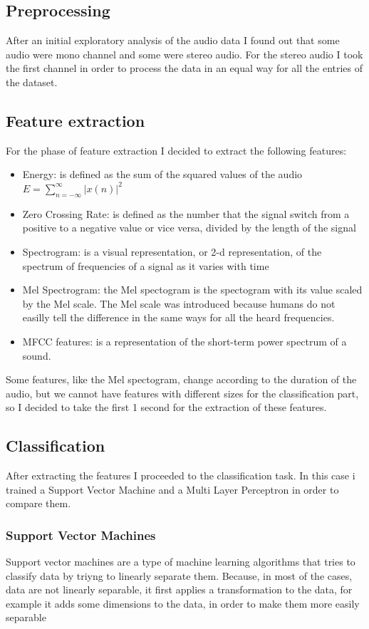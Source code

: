 \documentclass[12pt,journal,compsoc]{IEEEtran}
\begin{document}
\subsection{Preprocessing}
After an initial exploratory analysis of the audio data I found out that some audio were mono channel and some were stereo audio. For the stereo audio I took the first channel in order to process the data in an equal way for all the entries of the dataset.
\subsection{Feature extraction}
For the phase of feature extraction I decided to extract the following features:
\begin{itemize}
	\item Energy: is defined as the sum of the squared values of the audio $E = \sum_{n=-\infty}^\infty |x(n)|^2$
	\item Zero Crossing Rate: is defined as the number that the signal switch from a positive to a negative value or vice versa, divided by the length of the signal
	\item Spectrogram: is a visual representation, or 2-d representation, of the spectrum of frequencies of a signal as it varies with time\cite{spectogram}
	\item Mel Spectrogram: the Mel spectogram is the spectogram with its value scaled by the Mel scale. The Mel scale was introduced because humans do not easilly tell the difference in the same ways for all the heard frequencies.
	\item MFCC features: is a representation of the short-term power spectrum of a sound.
\end{itemize}

Some features, like the Mel spectogram, change according to the duration of the audio, but we cannot have features with different sizes for the classification part, so I decided to take the first 1 second for the extraction of these features.

\subsection{Classification}
After extracting the features I proceeded to the classification task. In this case i trained a Support Vector Machine and a Multi Layer Perceptron in order to compare them.
\subsubsection{Support Vector Machines}
Support vector machines are a type of machine learning algorithms that tries to classify data by triyng to linearly separate them. Because, in most of the cases, data are not linearly separable, it first applies a transformation to the data, for example it adds some dimensions to the data, in order to make them more easily separable
\end{document}
